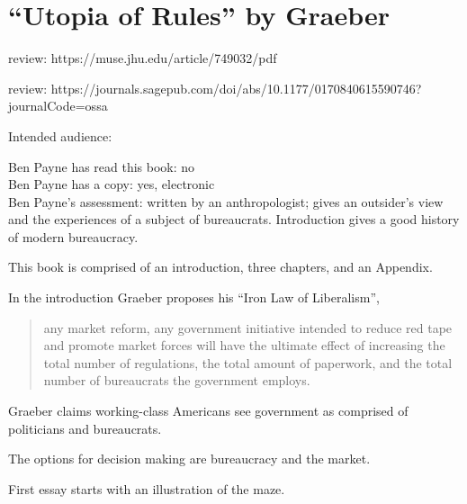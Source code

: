 \section{``Utopia of Rules'' by Graeber\label{review:graeber_utopia}}

\cite{2015_Graeber}

review: https://muse.jhu.edu/article/749032/pdf

review: https://journals.sagepub.com/doi/abs/10.1177/0170840615590746?journalCode=ossa


Intended audience:

Ben Payne has read this book: no\\
Ben Payne has a copy: yes, electronic\\
Ben Payne's assessment: written by an anthropologist; gives an outsider's view and the experiences of a subject of bureaucrats. Introduction gives a good history of modern bureaucracy.


This book is comprised of an introduction, three chapters, and an Appendix. 

In the introduction Graeber proposes his ``Iron Law of Liberalism'',
\begin{quote}
    any market reform, any government initiative intended to reduce red tape and promote market forces will have the ultimate effect of increasing the total number of regulations, the total amount of paperwork, and the total number of bureaucrats the government employs.
\end{quote}

Graeber claims working-class Americans see government as comprised of politicians and bureaucrats.

The options for decision making are bureaucracy and the market.


First essay starts with an illustration of the maze.